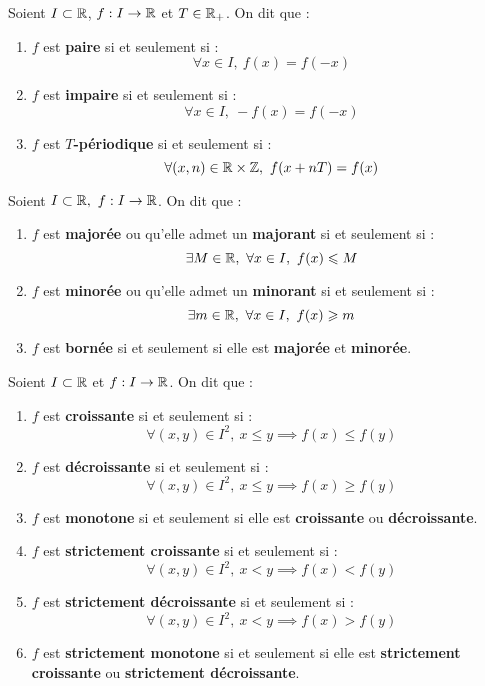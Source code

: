 \begin{definition}
	Soient $I \subset \mathbb{R}$, $f : I \to \mathbb{R}$ et $T \in \mathbb{R}_+$. On dit que :
    \begin{enumerate}
        \item $f$ est \textbf{paire} si et seulement si : 
        \[ \forall x \in I,\ f(x) = f(-x) \]
        \item $f$ est \textbf{impaire} si et seulement si  :
        \[ \forall x \in I,\ -f(x) = f(-x) \]
        \item $f$ est \textbf{$T$-périodique} si et seulement si :
        \[ \forall (x,n) \in \mathbb{R} \times \mathbb{Z},\ f(x + nT) = f(x) \]
    \end{enumerate}
\end{definition}

\begin{definition}
	Soient $I \subset \mathbb{R},\ f : I \to \mathbb{R}$. On dit que :
	\begin{enumerate}
	    \item $f$ est \textbf{majorée} ou qu'elle admet un \textbf{majorant} si et seulement si : 
	    \[ \exists M \in \mathbb{R},\ \forall x \in I,\ f(x) \leqslant M \]
        \item $f$ est \textbf{minorée} ou qu'elle admet un \textbf{minorant} si et seulement si :
        \[ \exists m \in \mathbb{R},\ \forall x \in I,\ f(x) \geqslant m \]
        \item $f$ est \textbf{bornée} si et seulement si elle est \textbf{majorée} et \textbf{minorée}.
	\end{enumerate}
\end{definition}

\begin{definition}
	Soient $I \subset \mathbb{R}$ et $f : I \to \mathbb{R}$. On dit que :
    \begin{enumerate}
        \item $f$ est \textbf{croissante} si et seulement si :
        \[ \forall (x, y) \in I^2,\ x \leq y \implies f(x) \leq f(y) \]
        \item $f$ est \textbf{décroissante} si et seulement si : 
        \[ \forall (x, y) \in I^2,\ x \leq y \implies f(x) \geq f(y) \]
        \item $f$ est \textbf{monotone} si et seulement si elle est \textbf{croissante} ou \textbf{décroissante}.
        \item $f$ est \textbf{strictement croissante} si et seulement si : 
        \[ \forall (x, y) \in I^2,\ x < y \implies f(x) < f(y) \]
        \item $f$ est \textbf{strictement décroissante} si et seulement si :
        \[ \forall (x, y) \in I^2,\ x < y \implies f(x) > f(y) \]
        \item $f$ est \textbf{strictement monotone} si et seulement si elle est \textbf{strictement croissante} ou \textbf{strictement décroissante}.
    \end{enumerate}
\end{definition}


